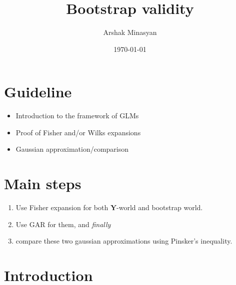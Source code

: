 \documentclass[12pt]{article}
\title{Bootstrap validity}
\author{Arshak Minasyan}
\date{\today}
\renewcommand{\=}[1]{\stackrel{#1}{=}} %
\begin{document}
\maketitle
\section*{Guideline} 
\begin{itemize}
\item Introduction to the framework of GLMs
\item Proof of Fisher and/or Wilks expansions 
\item {\color{blue} Gaussian approximation/comparison}  
\end{itemize}
\section*{Main steps}
\begin{enumerate}
\item Use Fisher expansion for both $\mathbf{Y}$-world and bootstrap world. 
\item Use GAR for them, and {\it{finally}}
\item compare these two gaussian approximations using Pinsker's inequality. 
\end{enumerate}
\section{Introduction}
\end{document}
